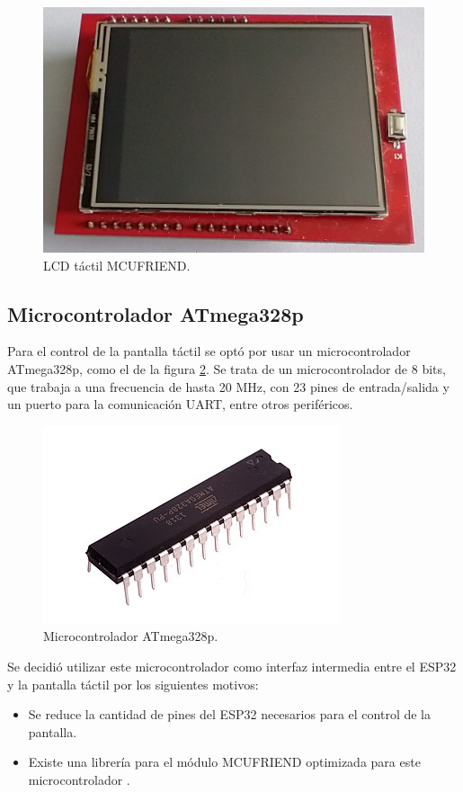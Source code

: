 \begin{figure}[htbp]
	\centering
	\includegraphics[width=.5\textwidth]{./Figures/LCDFrente.jpeg}
	\caption{LCD táctil MCUFRIEND.}
	\label{fig:LCDFrente}
\end{figure}

\subsection{Microcontrolador ATmega328p}

Para el control de la pantalla táctil se optó por usar un microcontrolador ATmega328p, como el de la figura \ref{fig:ATmega328p}. Se trata de un microcontrolador de 8 bits, que trabaja a una frecuencia de hasta 20 MHz, con 23 pines de entrada/salida y un puerto para la comunicación UART, entre otros periféricos.

\begin{figure}[htbp]
	\centering
	\includegraphics[width=.3\textwidth]{./Figures/ATMEGA328P.jpg}
	\caption{Microcontrolador ATmega328p\protect\footnotemark.}
	\label{fig:ATmega328p}
\end{figure}


Se decidió utilizar este microcontrolador como interfaz intermedia entre el ESP32 y la pantalla táctil por los siguientes motivos:

\begin{itemize}
	\item Se reduce la cantidad de pines del ESP32 necesarios para el control de la pantalla.
	\item Existe una librería para el módulo MCUFRIEND optimizada para este microcontrolador \citep{WEBSITE:1}.
\end{itemize}
	
